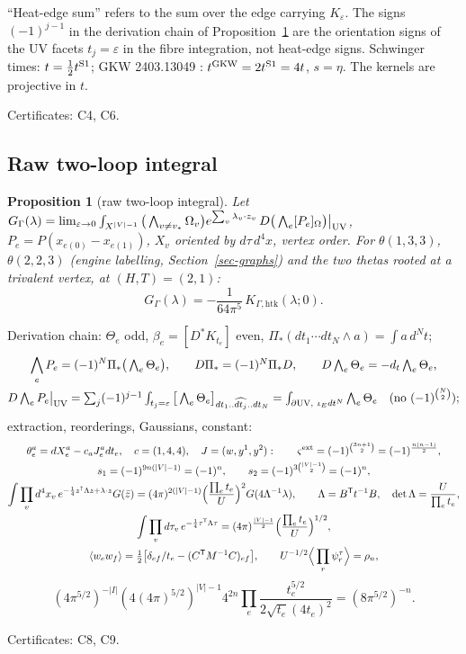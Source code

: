 \documentclass[10pt,a4paper]{article}
\numberwithin{equation}{section}
\newtheorem{proposition}[theorem]{Proposition}
\theoremstyle{definition}
\theoremstyle{remark}
\newcommand{\zb}{\bar z}
\newcommand{\htk}{\mathrm{htk}}
\newcommand{\cert}[1]{\par\noindent\textup{Certificates: #1.}\par}
\begin{document}
``Heat-edge sum'' refers to the sum over the edge carrying $K_\varepsilon$. The signs $(-1)^{j-1}$ in the derivation chain of Proposition~\ref{prop-raw} are the orientation signs of the UV facets $t_j=\varepsilon$ in the fibre integration, not heat-edge signs. Schwinger times: $t=\tfrac12t^{\rm S1}$; GKW 2403.13049 \cite{GKW}: $t^{\rm GKW}=2t^{\rm S1}=4t$, $s=\eta$. The kernels are projective in $t$.
\cert{C4, C6}

\subsection{Raw two-loop integral}

\begin{proposition}[raw two-loop integral]\label{prop-raw}
Let $G_\Gamma(\lambda)=\lim_{\varepsilon\to0}\int_{X^{|V|-1}}\big(\bigwedge_{v\neq v_*}\Omega_v\big)e^{\sum_v\lambda_v\cdot z_v}\,D\big(\bigwedge_e[P_e]_\Omega\big)\big|_{\rm UV}$, $P_e=P(x_{e(0)}-x_{e(1)})$, $X_v$ oriented by $d\tau\,d^4x$, vertex order. For $\theta(1,3,3)$, $\theta(2,2,3)$ (engine labelling, Section~\ref{sec-graphs}) and the two thetas rooted at a trivalent vertex, at $(H,T)=(2,1)$:
\begin{equation}
G_\Gamma(\lambda)=-\frac{1}{64\pi^5}\,K_{\Gamma,\htk}(\lambda;0).
\end{equation}
\end{proposition}
Derivation chain: $\Theta_e$ odd, $\beta_e=[D^*K_{t_e}]$ even, $\Pi_*(dt_1\cdots dt_N\wedge a)=\int a\,d^Nt$;
\begin{gather}
\bigwedge_eP_e=(-1)^N\Pi_*\big(\textstyle\bigwedge_e\Theta_e\big),\qquad D\Pi_*=(-1)^N\Pi_*D,\qquad D\textstyle\bigwedge_e\Theta_e=-d_t\bigwedge_e\Theta_e,\\
D\textstyle\bigwedge_eP_e\big|_{\rm UV}=\sum_j(-1)^{j-1}\int_{t_j=\varepsilon}\big[\bigwedge_e\Theta_e\big]_{dt_1..\widehat{dt_j}..dt_N}=\int_{\partial{\rm UV},\ \iota_Edt^N}\bigwedge_e\Theta_e\quad(\text{no }(-1)^{\binom N2});
\end{gather}
extraction, reorderings, Gaussians, constant:
\begin{gather}
\theta^a_e=dX^a_e-c_aJ^a_edt_e,\quad c=(1,4,4),\quad J=(w,y^1,y^2):\qquad \varsigma^{\rm ext}=(-1)^{\binom{3n+1}2}=(-1)^{\frac{n(n-1)}2},\\
s_1=(-1)^{9n(|V|-1)}=(-1)^n,\qquad s_2=(-1)^{3\binom{|V|-1}2}=(-1)^n,\\
\int\prod_vd^4x_v\,e^{-\frac14z^\dagger\Lambda z+\lambda\cdot z}G(\zb)=(4\pi)^{2(|V|-1)}\Big(\frac{\prod_et_e}U\Big)^2G(4\Lambda^{-1}\lambda),\qquad \Lambda=B^{\mathsf T}t^{-1}B,\quad \det\Lambda=\frac{U}{\prod_et_e},\label{eq-holGauss}\\
\int\prod_vd\tau_v\,e^{-\frac14\tau^{\mathsf T}\Lambda\tau}=(4\pi)^{\frac{|V|-1}2}\Big(\frac{\prod_et_e}U\Big)^{1/2},\\ \langle w_ew_f\rangle=\tfrac12\big[\delta_{ef}/t_e-(C^{\mathsf T}M^{-1}C)_{ef}\big],\qquad U^{-1/2}\Big\langle\prod_r\psi^\tau_r\Big\rangle=\rho_n,
\end{gather}
\begin{equation}
(4\pi^{5/2})^{-|I|}(4(4\pi)^{5/2})^{|V|-1}4^{2n}\prod_e\frac{t_e^{5/2}}{2\sqrt{t_e}(4t_e)^2}=(8\pi^{5/2})^{-n} .
\end{equation}
\cert{C8, C9}
\end{document}
